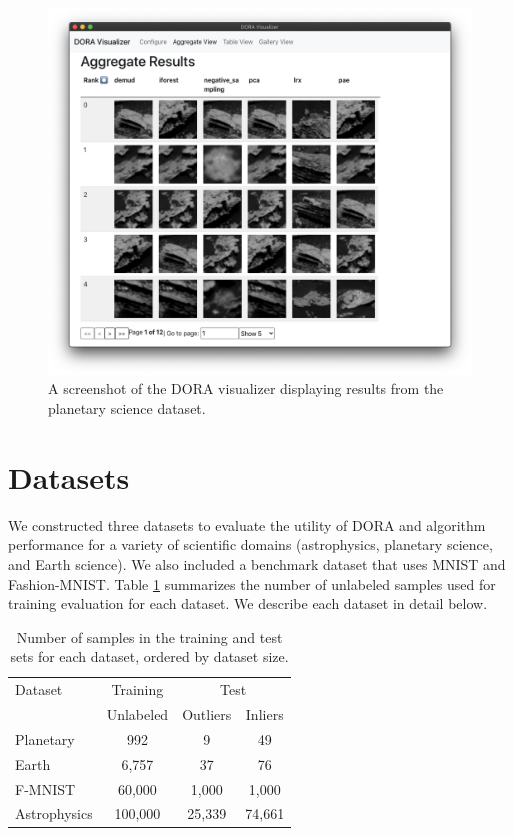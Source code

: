 \documentclass[letterpaper]{article} %
\begin{document}
\begin{figure}
  \centering
  \includegraphics[width=0.9\linewidth]{figures/doravis.png}
  \caption{A screenshot of the DORA visualizer displaying results from the
  planetary science dataset.}
  \label{fig:doravis}
\end{figure}

\section{Datasets}
We constructed three datasets to evaluate the utility of DORA and 
algorithm performance for a variety of scientific domains
 (astrophysics, planetary science, and Earth science). We also included a 
 benchmark dataset that uses MNIST and Fashion-MNIST. Table \ref{tab:datasets}
 summarizes the number of unlabeled samples used for training evaluation for
 each dataset. We describe each dataset in detail below.
 
 \begin{table}
  \caption{Number of samples in the training and test sets for each dataset,
  ordered by dataset size.}
  \label{tab:datasets}
  \centering
  \begin{tabular}{l|c|cc}
    \hline
    Dataset & Training & \multicolumn{2}{c}{Test}\\
     & Unlabeled &  Outliers &  Inliers \\
    
    \hline
    Planetary & 992 &  9 & 49 \\
    Earth & 6,757 & 37 & 76  \\
    F-MNIST & 60,000 & 1,000 & 1,000  \\
    Astrophysics & 100,000   &  25,339 &  74,661 \\
    \hline
  \end{tabular}
\end{table}
\end{document}
